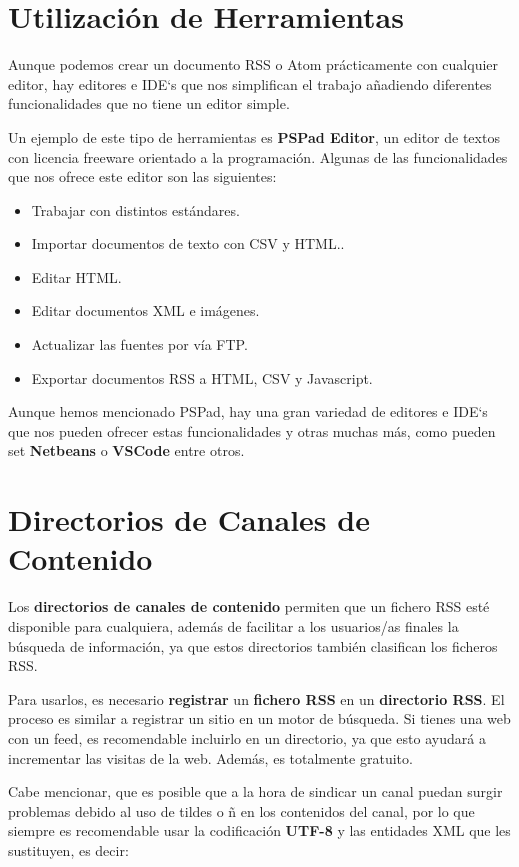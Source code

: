 \section{Utilización de Herramientas}
Aunque podemos crear un documento RSS o Atom prácticamente con cualquier editor, hay editores e IDE`s que nos simplifican el trabajo añadiendo diferentes funcionalidades que no tiene un editor simple.

Un ejemplo de este tipo de herramientas es \textbf{PSPad Editor}, un editor de textos con licencia freeware orientado a la programación. Algunas de las funcionalidades que nos ofrece este editor son las siguientes:

\begin{itemize}
    \item Trabajar con distintos estándares.
    \item Importar documentos de texto con CSV y HTML..
    \item Editar HTML.
    \item Editar documentos XML e imágenes.
    \item Actualizar las fuentes por vía FTP.
    \item Exportar documentos RSS a HTML, CSV y Javascript.
\end{itemize}

Aunque hemos mencionado PSPad, hay una gran variedad de editores e IDE`s que nos pueden ofrecer estas funcionalidades y otras muchas más, como pueden set \textbf{Netbeans} o \textbf{VSCode} entre otros.

\section{Directorios de Canales de Contenido}
Los \textbf{directorios de canales de contenido} permiten que un fichero RSS esté disponible para cualquiera, además de facilitar a los usuarios/as finales la búsqueda de información, ya que estos directorios también clasifican los ficheros RSS.

Para usarlos, es necesario \textbf{registrar} un \textbf{fichero RSS} en un \textbf{directorio RSS}. El proceso es similar a registrar un sitio en un motor de búsqueda. Si tienes una web con un feed, es recomendable incluirlo en un directorio, ya que esto ayudará a incrementar las visitas de la web. Además, es totalmente gratuito.

Cabe mencionar, que es posible que a la hora de sindicar un canal puedan surgir problemas debido al uso de tildes o ñ en los contenidos del canal, por lo que siempre es recomendable usar la codificación \textbf{UTF-8} y las entidades XML que les sustituyen, es decir:

